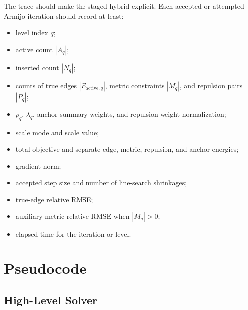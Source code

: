 \documentclass[11pt]{article}
\begin{document}
The trace should make the staged hybrid explicit. Each accepted or attempted
Armijo iteration should record at least:
\begin{itemize}[leftmargin=2em]
  \item level index \(q\);
  \item active count \(|A_q|\);
  \item inserted count \(|N_q|\);
  \item counts of true edges \(|E_{\mathrm{active},q}|\), metric constraints
  \(|M_q|\), and repulsion pairs \(|P_q|\);
  \item \(\rho_q\), \(\lambda_q\), anchor summary weights, and repulsion weight
  normalization;
  \item scale mode and scale value;
  \item total objective and separate edge, metric, repulsion, and anchor
  energies;
  \item gradient norm;
  \item accepted step size and number of line-search shrinkages;
  \item true-edge relative RMSE;
  \item auxiliary metric relative RMSE when \(|M_q|>0\);
  \item elapsed time for the iteration or level.
\end{itemize}

\section{Pseudocode}

\subsection{High-Level Solver}
\end{document}
